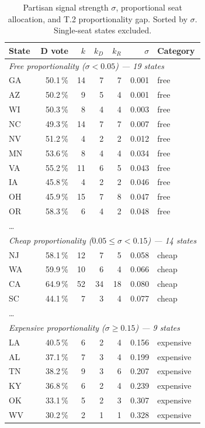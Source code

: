 \begin{table}[h]
\centering
\caption{Partisan signal strength $\sigma$, proportional seat allocation, and
T.2 proportionality gap.  Sorted by $\sigma$. Single-seat states excluded.}
\label{tab:sigma}
\small
\begin{tabular}{lrrrrrl}
\toprule
State & D vote & $k$ & $k_D$ & $k_R$ & $\sigma$ & Category \\
\midrule
\multicolumn{7}{l}{\textit{Free proportionality ($\sigma < 0.05$) --- 19 states}} \\
GA & 50.1\,\% & 14 & 7 & 7 & 0.001 & free \\
AZ & 50.2\,\% &  9 & 5 & 4 & 0.001 & free \\
WI & 50.3\,\% &  8 & 4 & 4 & 0.003 & free \\
NC & 49.3\,\% & 14 & 7 & 7 & 0.007 & free \\
NV & 51.2\,\% &  4 & 2 & 2 & 0.012 & free \\
MN & 53.6\,\% &  8 & 4 & 4 & 0.034 & free \\
VA & 55.2\,\% & 11 & 6 & 5 & 0.043 & free \\
IA & 45.8\,\% &  4 & 2 & 2 & 0.046 & free \\
OH & 45.9\,\% & 15 & 7 & 8 & 0.047 & free \\
OR & 58.3\,\% &  6 & 4 & 2 & 0.048 & free \\
\ldots \\
\midrule
\multicolumn{7}{l}{\textit{Cheap proportionality ($0.05 \leq \sigma < 0.15$) --- 14 states}} \\
NJ & 58.1\,\% & 12 & 7 & 5 & 0.058 & cheap \\
WA & 59.9\,\% & 10 & 6 & 4 & 0.066 & cheap \\
CA & 64.9\,\% & 52 & 34 & 18 & 0.080 & cheap \\
SC & 44.1\,\% &  7 & 3 & 4 & 0.077 & cheap \\
\ldots \\
\midrule
\multicolumn{7}{l}{\textit{Expensive proportionality ($\sigma \geq 0.15$) --- 9 states}} \\
LA & 40.5\,\% &  6 & 2 & 4 & 0.156 & expensive \\
AL & 37.1\,\% &  7 & 3 & 4 & 0.199 & expensive \\
TN & 38.2\,\% &  9 & 3 & 6 & 0.207 & expensive \\
KY & 36.8\,\% &  6 & 2 & 4 & 0.239 & expensive \\
OK & 33.1\,\% &  5 & 2 & 3 & 0.307 & expensive \\
WV & 30.2\,\% &  2 & 1 & 1 & 0.328 & expensive \\
\bottomrule
\end{tabular}
\end{table}

